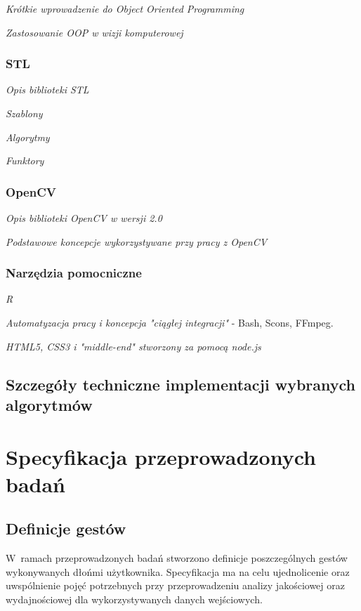 \textit{Krótkie wprowadzenie do Object Oriented Programming}

\textit{Zastosowanie OOP w wizji komputerowej}

\subsection{STL}\label{Subsection_STL}
\textit{Opis biblioteki STL}\cite{EffectiveStl}

\textit{Szablony}

\textit{Algorytmy}

\textit{Funktory}

\subsection{OpenCV}\label{Subsection_OpenCV}

\textit{Opis biblioteki OpenCV w wersji 2.0}\cite{LearningOpenCV}

\textit{Podstawowe koncepcje wykorzystywane przy pracy z OpenCV}\cite{OpenCVCookbook}

\subsection{Narzędzia pomocniczne}\label{Subsection_PomocniczeTechnologie}
\textit{R}

\textit{Automatyzacja pracy i koncepcja "ciągłej integracji"} - Bash, Scons, FFmpeg.

\textit{HTML5, CSS3 i "middle-end" stworzony za pomocą node.js}

\section{Szczegóły techniczne implementacji wybranych algorytmów}

\chapter{Specyfikacja przeprowadzonych badań}\label{Chapter_SpecyfikacjaPrzeprowadzonychBadan}

\section{Definicje gestów}\label{Section_DefinicjeGestow}

W~ramach przeprowadzonych badań stworzono definicje poszczególnych gestów wykonywanych dłońmi użytkownika. Specyfikacja ma na celu ujednolicenie oraz uwspólnienie pojęć potrzebnych przy przeprowadzeniu analizy jakościowej oraz wydajnościowej dla wykorzystywanych danych wejściowych.

